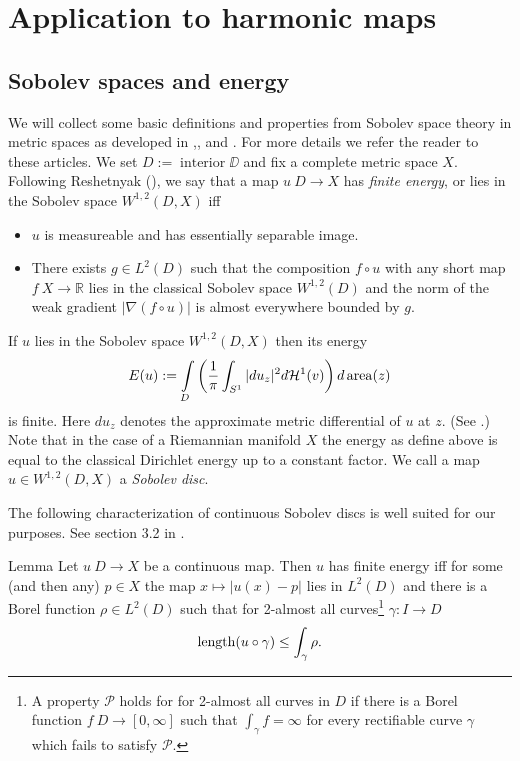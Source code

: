 \documentclass[a4paper,10pt]{amsart}
\begin{document}
\section{Application to harmonic maps}

\subsection{Sobolev spaces and energy}

We will collect some basic definitions and properties from Sobolev space theory in metric spaces as developed in 
\cite{KS},\cite{R}, \cite{HKST} and \cite{LW}. For more details we refer the reader to these articles.
We set $D:=\operatorname{interior}\DD$ and fix a complete metric space $X$.
Following Reshetnyak (\cite{R}), we say that a map $u\:D\to X$ has {\em finite energy}, or lies in the Sobolev space $W^{1,2}(D,X)$ iff
\begin{itemize}
 \item $u$ is measureable and has essentially separable image.
 \item There exists $g\in L^2(D)$ such that the composition $f\circ u$ with any short map $f\:X\to \mathbb{R}$ 
lies in the classical Sobolev space $W^{1,2}(D)$
 and the norm of the weak gradient $|\nabla(f\circ u)|$ is almost everywhere bounded by $g$.
\end{itemize}

If $u$ lies in the Sobolev space $W^{1,2}(D,X)$ then its energy 
\[E(u):=\int\limits_{D}\left(\frac{1}{\pi}\int_{S^1}|du_z|^2 d\mathcal{H}^1(v)\right) d\mathop{\rm area}\nolimits(z)\]
is finite. Here $du_z$ denotes the approximate metric differential of $u$ at $z$. (See \cite{LW}.)
Note that in the case of a Riemannian manifold $X$ the energy as define above is equal to
the classical Dirichlet energy up to a constant factor.
We call a map $u\in W^{1,2}(D,X)$ a {\em Sobolev disc}.

The following characterization of continuous Sobolev discs is well suited for our purposes.
See section 3.2 in \cite{LW3}.


\begin{thm}{Lemma}\label{lem:sobolevchar}
Let $u\:D\to X$ be a continuous map. Then $u$ has finite energy iff
for some (and then any) $p\in X$ the map $x\mapsto|u(x)-p|$ lies in $L^2(D)$ and
there is a Borel function $\rho\in L^2(D)$ such that for 2-almost all curves\footnote{A property $\mathcal{P}$ holds for 
for 2-almost all curves in $D$ if there is a Borel function $f\:D\to[0,\infty]$ such that $\int_\gamma f=\infty$
for every rectifiable curve $\gamma$ which fails to satisfy $\mathcal{P}$.} $\gamma:I\to D$
$$
\mathop{\rm length}\nolimits(u\circ \gamma)\leq\int_\gamma \rho.
$$
\end{thm}
\end{document}
